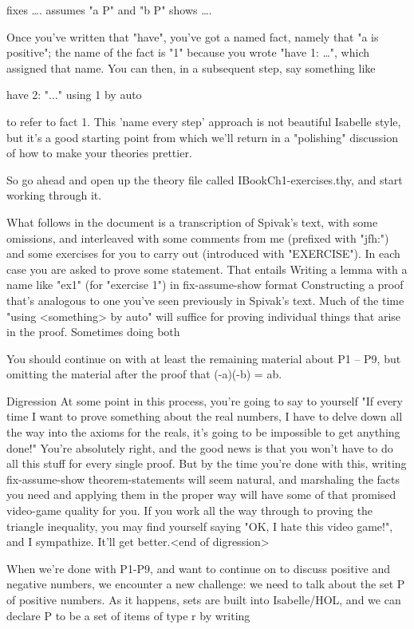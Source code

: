    fixes ….
   assumes "a \in P" and "b \in P"
   shows ….

Once you've written that "have", you've got a named fact, namely that "a is positive"; the name of the fact is "1" because you wrote "have 1: …", which assigned that name. You can then, in a subsequent step, say something like

   have 2: "..." using 1 by auto

to refer to fact 1. This 'name every step' approach is not beautiful Isabelle style, but it's a good starting point from which we'll return in a "polishing" discussion of how to make your theories prettier. 

So go ahead and open up the theory file called IBookCh1-exercises.thy, and start working through it. 

What follows in the document is a transcription of Spivak's text, with some omissions, and interleaved with some comments from me (prefixed with "jfh:") and some exercises for you to carry out (introduced with "EXERCISE"). In each case you are asked to prove some statement. That entails
Writing a lemma with a name like "ex1" (for "exercise 1") in fix-assume-show format
Constructing a proof that's analogous to one you've seen previously in Spivak's text. Much of the time "using <something> by auto" will suffice for proving individual things that arise in the proof. 
Sometimes doing both

You should continue on with at least the remaining material about P1 -- P9, but omitting the material after the proof that (-a)(-b) = ab. 

Digression At some point in this process, you're going to say to yourself "If every time I want to prove something about the real numbers, I have to delve down all the way into the axioms for the reals, it's going to be impossible to get anything done!" You're absolutely right, and the good news is that you won't have to do all this stuff for every single proof. But by the time you're done with this, writing fix-assume-show theorem-statements will seem natural, and marshaling the facts you need and applying them in the proper way will have some of that promised video-game quality for you. If you work all the way through to proving the triangle inequality, you may find yourself saying "OK, I hate this video game!", and I sympathize. It'll get better.<end of digression>

When we're done with P1-P9, and want to continue on to discuss positive and negative numbers, we encounter a new challenge: we need to talk about the set P of positive numbers. As it happens, sets are built into Isabelle/HOL, and we can declare P to be a set of items of type r by writing 

